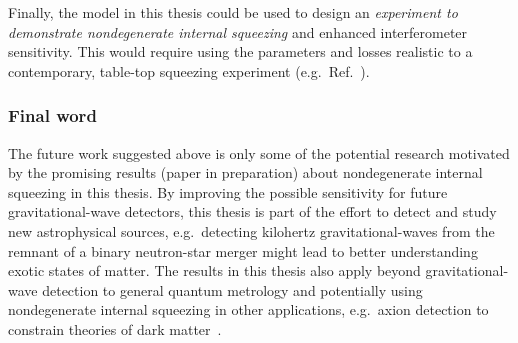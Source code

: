 

Finally, the model in this thesis could be used to design an \emph{experiment to demonstrate nondegenerate internal squeezing} and enhanced interferometer sensitivity. This would require using the parameters and losses realistic to a contemporary, table-top squeezing experiment (e.g.\ Ref.~\cite{sudbeck2020demonstration}). %


\subsubsection{Final word}
The future work suggested above is only some of the potential research motivated by the promising results (paper in preparation) about nondegenerate internal squeezing in this thesis.
By improving the possible sensitivity for future gravitational-wave detectors, this thesis is part of the effort to detect and study new astrophysical sources, e.g.\ detecting kilohertz gravitational-waves from the remnant of a binary neutron-star merger might lead to better understanding exotic states of matter.
The results in this thesis also apply beyond gravitational-wave detection to general quantum metrology and potentially using nondegenerate internal squeezing in other applications, e.g.\ axion detection to constrain theories of dark matter~\cite{MARSH20161,PhysRevX.9.021023,liBroadbandSensitivityImprovement2020}.


